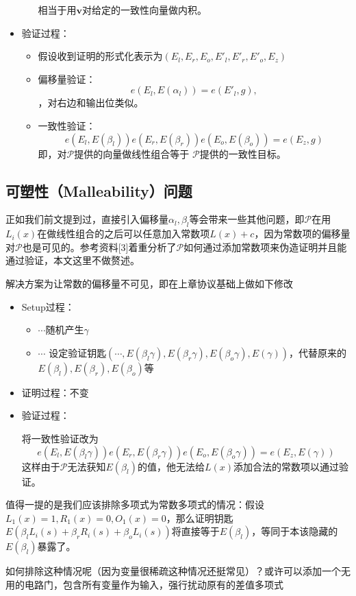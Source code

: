 \documentclass[12pt]{article}
\newcommand{\pp}{$\mathcal{P}$}
\begin{document}
\begin{itemize}
\begin{itemize}
     	 相当于用$\bm{v}$对给定的一致性向量做内积。
     	\end{itemize}
     \item 验证过程：
     \begin{itemize}
     	\item 假设收到证明的形式化表示为$(E_l,E_r,E_o,E'_l,E'_r,E'_o,E_z)$
     	\item 偏移量验证：
     	       $$e(E_l,E(\alpha_l))=e(E'_l,g),$$，对右边和输出位类似。
     	 \item 一致性验证：
     	     $$e(E_l,E(\beta_l))e(E_r,E(\beta_r))e(E_o,E(\beta_o))=e(E_z,g)$$
     	     即，对\pp 提供的向量做线性组合等于 \pp 提供的一致性目标。
     \end{itemize}
\end{itemize}
\subsection{可塑性（Malleability）问题}
正如我们前文提到过，直接引入偏移量$\alpha_l,\beta_l$等会带来一些其他问题，即\pp 在用$L_i(x)$在做线性组合的之后可以任意加入常数项$L(x)+c$，因为常数项的偏移量对\pp 也是可见的。参考资料[3]着重分析了\pp 如何通过添加常数项来伪造证明并且能通过验证，本文这里不做赘述。

解决方案为让常数的偏移量不可见，即在上章协议基础上做如下修改
\begin{itemize}
	\item Setup过程：
	\begin{itemize}
		\item  $\cdots$随机产生$\gamma$
		\item $\cdots$ 设定验证钥匙$(\cdots,E(\beta_l\gamma),E(\beta_r\gamma),E(\beta_o\gamma),E(\gamma))$，代替原来的$E(\beta_l),E(\beta_r),E(\beta_o)$等
	\end{itemize}
	\item 证明过程：不变
	\item 验证过程：

   将一致性验证改为
  $$e(E_l,E(\beta_l\gamma))e(E_r,E(\beta_r\gamma))e(E_o,E(\beta_o\gamma))=e(E_z,E(\gamma))$$
 这样由于\pp 无法获知$E(\beta_l)$的值，他无法给$L(x)$添加合法的常数项以通过验证。
\end{itemize}

 {\color{red}值得一提的是我们应该排除多项式为常数多项式的情况：假设$L_1(x)=1,R_1(x)=0,O_1(x)=0$，那么证明钥匙$E(\beta_l L_i(s)+\beta_r R_i(s)+\beta_o L_i(s))$将直接等于$E(\beta_l)$，等同于本该隐藏的$E(\beta_l)$暴露了。

 如何排除这种情况呢（因为变量很稀疏这种情况还挺常见）？或许可以添加一个无用的电路门，包含所有变量作为输入，强行扰动原有的差值多项式}
\end{document}
